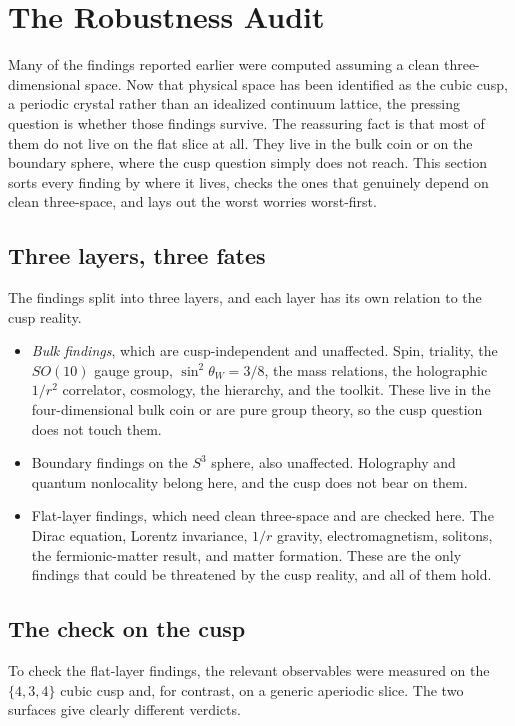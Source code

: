 \section{The Robustness Audit}

Many of the findings reported earlier were computed assuming a clean three-dimensional space. Now that physical
space has been identified as the cubic cusp, a periodic crystal rather than an idealized continuum lattice, the
pressing question is whether those findings survive. The reassuring fact is that most of them do not live on the
flat slice at all. They live in the bulk coin or on the boundary sphere, where the cusp question simply does not
reach. This section sorts every finding by where it lives, checks the ones that genuinely depend on clean
three-space, and lays out the worst worries worst-first.

\subsection{Three layers, three fates}

The findings split into three layers, and each layer has its own relation to the cusp reality.

\begin{itemize}
  \item \emph{Bulk findings}, which are cusp-independent and unaffected. Spin, triality, the $SO(10)$ gauge
  group, $\sin^2\theta_W = 3/8$, the mass relations, the holographic $1/r^2$ correlator, cosmology, the
  hierarchy, and the toolkit. These live in the four-dimensional bulk coin or are pure group theory, so the cusp
  question does not touch them.
  \item Boundary findings on the $S^3$ sphere, also unaffected. Holography and quantum nonlocality belong here,
  and the cusp does not bear on them.
  \item Flat-layer findings, which need clean three-space and are checked here. The Dirac equation, Lorentz
  invariance, $1/r$ gravity, electromagnetism, solitons, the fermionic-matter result, and matter formation. These
  are the only findings that could be threatened by the cusp reality, and all of them hold.
\end{itemize}

\subsection{The check on the cusp}

To check the flat-layer findings, the relevant observables were measured on the $\{4,3,4\}$ cubic cusp and, for
contrast, on a generic aperiodic slice. The two surfaces give clearly different verdicts.

